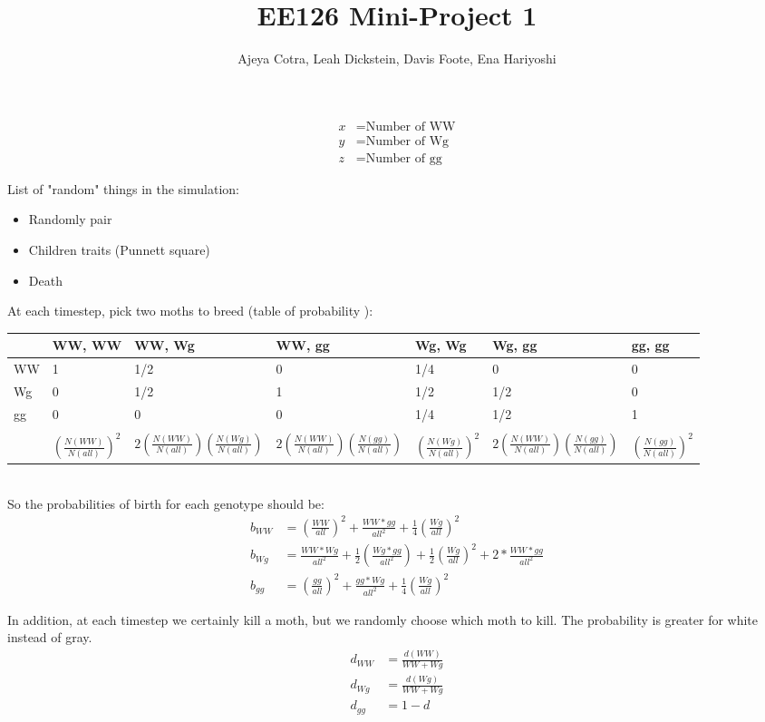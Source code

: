 \documentclass[leqno]{article}
\begin{document}
\title{EE126 Mini-Project 1}
\author{Ajeya Cotra, Leah Dickstein, Davis Foote, Ena Hariyoshi}

\maketitle

\begin{align*}
x &= \text{Number of WW}\\
y &= \text{Number of Wg}\\
z &= \text{Number of gg}
\end{align*}

List of "random" things in the simulation:
\begin{itemize}
\item Randomly pair
\item Children traits (Punnett square)
\item Death %
\end{itemize}

At each timestep, pick two moths to breed (table of probability ):\\  
\begin{tabular}{l|l|l|l|l|l|l}
{} & WW, WW & WW, Wg & WW, gg & Wg, Wg & Wg, gg & gg, gg\\
\hline
WW & 1 & 1/2 & 0 & 1/4 & 0 & 0\\
Wg & 0 & 1/2 & 1 & 1/2 & 1/2 & 0\\
gg & 0 & 0 & 0 & 1/4 & 1/2 & 1\\
\hline\\
{} & $(\frac{N(WW)}{N(all)})^2$ & $2(\frac{N(WW)}{N(all)})(\frac{N(Wg)}{N(all)})$ & $2(\frac{N(WW)}{N(all)})(\frac{N(gg)}{N(all)})$ & $(\frac{N(Wg)}{N(all)})^2$ & $2(\frac{N(WW)}{N(all)})(\frac{N(gg)}{N(all)})$ & $(\frac{N(gg)}{N(all)})^2$
\end{tabular}\\

So the probabilities of birth for each genotype should be:
\begin{align*}
b_{WW} &= \left(\frac{WW}{all} \right)^2 + \frac{WW*gg}{all^2} + \frac{1}{4}\left(\frac{Wg}{all}\right)^2\\
b_{Wg} &= \frac{WW*Wg}{all^2} + \frac{1}{2}\left(\frac{Wg*gg}{all^2}\right) + \frac{1}{2}\left(\frac{Wg}{all}\right)^2 + 2*\frac{WW*gg}{all^2}\\
b_{gg} &= \left(\frac{gg}{all}\right)^2 + \frac{gg*Wg}{all^2} + \frac{1}{4} \left(\frac{Wg}{all}\right)^2
\end{align*}

In addition, at each timestep we certainly kill a moth, but we randomly choose which moth to kill. The probability is greater for white instead of gray.
\begin{align*}
d_{WW} &= \frac{d(WW)}{WW+Wg}\\
d_{Wg} &= \frac{d(Wg)}{WW+Wg}\\
d_{gg} &= 1-d
\end{align*}



\end{document}
